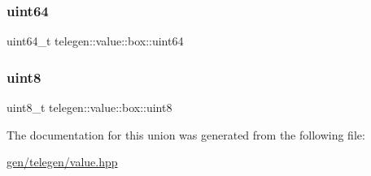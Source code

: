 \subsubsection{\texorpdfstring{uint64}{uint64}}
{\footnotesize\ttfamily uint64\+\_\+t telegen\+::value\+::box\+::uint64}

\mbox{\label{uniontelegen_1_1value_1_1box_af93ba02e91378fcc5dfd7dd44797d9f1}} 
\subsubsection{\texorpdfstring{uint8}{uint8}}
{\footnotesize\ttfamily uint8\+\_\+t telegen\+::value\+::box\+::uint8}



The documentation for this union was generated from the following file\+:\begin{DoxyCompactItemize}
\item 
\hyperlink{gen_2telegen_2value_8hpp}{gen/telegen/value.\+hpp}\end{DoxyCompactItemize}
